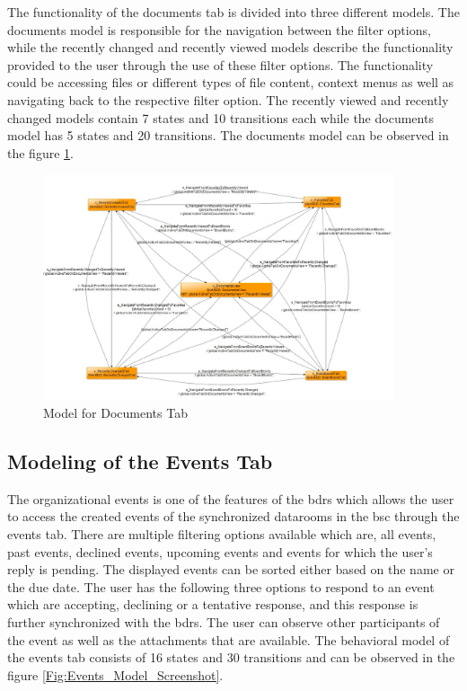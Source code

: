 \par
The functionality of the documents tab is divided into three different models. The documents model is responsible for the navigation between the filter options, while the recently changed and recently viewed models describe the functionality provided to the user through the use of these filter options. The functionality could be accessing files or different types of file content, context menus as well as navigating back to the respective filter option. The recently viewed and recently changed models contain 7 states and 10 transitions each while the documents model has 5 states and 20 transitions. The documents model can be observed in the figure \ref{Fig:Documents_Model_Screenshot}. 

\begin{figure} [htbp!]
	\centering
					\includegraphics[width=0.92\textwidth]{figures/Documents_model_screenshot}
					\caption{\label{Fig:Documents_Model_Screenshot} Model for Documents Tab}
\end{figure}


\subsection{Modeling of the Events Tab}
\par
The organizational events is one of the features of the \acrshort{bdrs} which allows the user to access the created events of the synchronized datarooms in the \acrshort{bsc} through the events tab. There are multiple filtering options available which are, all events, past events, declined events, upcoming events and events for which the user's reply is pending. The displayed events can be sorted either based on the name or the due date. The user has the following three options to respond to an event which are accepting, declining or a tentative response, and this response is further synchronized with the \acrshort{bdrs}. The user can observe other participants of the event as well as the attachments that are available. The behavioral model of the events tab consists of 16 states and 30 transitions and can be observed in the figure \ref{Fig:Events_Model_Screenshot}.

